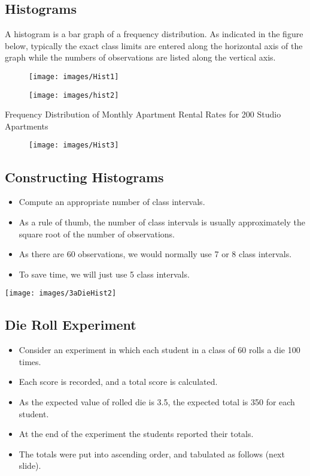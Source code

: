 \documentclass[]{report}
\begin{document}
	
	\subsection{Histograms}
	A histogram is a bar graph of a frequency distribution. As indicated in the figure below, typically the exact class limits are entered along the horizontal axis of the graph while the numbers of observations are listed along the vertical axis. 
	\begin{figure}
	\centering
	\texttt{[image: images/Hist1]}
	\end{figure}

	\begin{figure}
	\centering
	\texttt{[image: images/hist2]}
	\end{figure}
	
	Frequency Distribution of Monthly Apartment Rental Rates for 200 Studio Apartments
	\begin{figure}
	\centering
	\texttt{[image: images/Hist3]}
	\end{figure}
	
	\subsection{Constructing Histograms}
	\begin{itemize}
		\item Compute an appropriate number of class intervals.
		\item As a rule of thumb, the number of class intervals is usually approximately the square root of the number of observations.
		\item As there are 60 observations, we would normally use 7 or 8 class intervals.
		\item To save time, we will just use 5 class intervals.
	\end{itemize}
	
	
\begin{center}
\texttt{[image: images/3aDieHist2]}
\end{center}
	


	\subsection{Die Roll Experiment}
	
	\begin{itemize}
		\item Consider an experiment in which each student in a class of 60 rolls a die 100 times.
		\item Each score is recorded, and a total score is calculated.
		\item As the expected value of rolled die is 3.5, the expected total is 350 for each student.
		\item At the end of the experiment the students reported their totals.
		\item The totals were put into ascending order, and tabulated as follows (next slide).
	\end{itemize}
\end{document}
